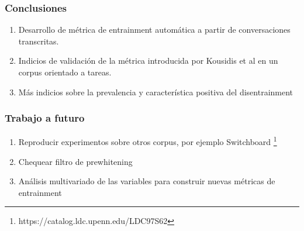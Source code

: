 \begin{frame}
\frametitle{Conclusiones}

\begin{enumerate}
  \item Desarrollo de métrica de entrainment automática a partir de conversaciones transcritas.
  \item Indicios de validación de la métrica introducida por Kousidis et al en un corpus orientado a tareas.
  \item Más indicios sobre la prevalencia y característica positiva del disentrainment
\end{enumerate}


\end{frame}

\begin{frame}
\frametitle{Trabajo a futuro}

\begin{enumerate}
  \item Reproducir experimentos sobre otros corpus, por ejemplo Switchboard \footnote{https://catalog.ldc.upenn.edu/LDC97S62}
  \item Chequear filtro de prewhitening
  \item Análisis multivariado de las variables \ap para construir nuevas métricas de entrainment
\end{enumerate}
\end{frame}
